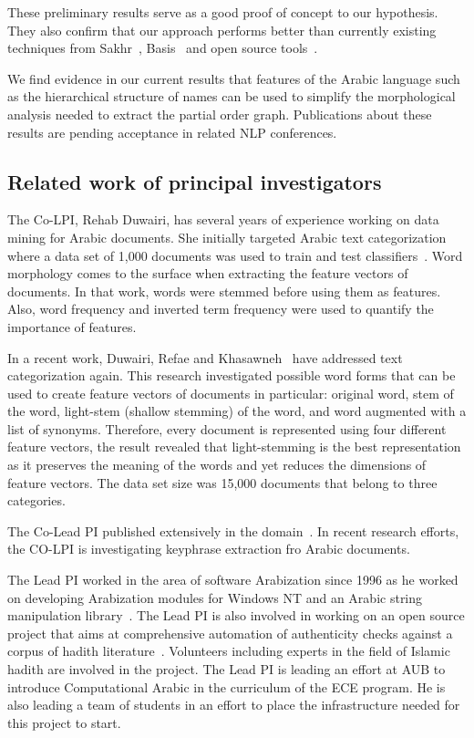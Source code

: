 \documentclass[12pt]{article}
\begin{document}
These preliminary results serve as a good proof of concept to our 
hypothesis. They also confirm that our approach performs better than 
currently existing techniques from Sakhr~\cite{Sak09},
Basis~\cite{Bas09} and open source 
tools~\cite{Col09,Otakar:07,Tim04}.

We find evidence in our current results that features 
of the Arabic language such as the hierarchical structure of
names can be used to simplify the morphological analysis
needed to extract the partial order graph. 
Publications about these results are pending acceptance in 
related NLP conferences. 

\subsection{Related work of principal investigators}

The Co-LPI, Rehab Duwairi, has several years of experience 
working on data mining for Arabic documents. 
She initially targeted Arabic text categorization where a 
data set of 1,000 documents was used to train and test 
classifiers~\cite{Duw06,Duw07}.
Word morphology comes to the surface when extracting the 
feature vectors of documents. 
In that work, words were stemmed before using them as features. 
Also, word frequency and inverted term frequency were used to 
quantify the importance of features. 

In a recent work, Duwairi, Refae and Khasawneh~\cite{Duw09}
have addressed text categorization again. 
This research investigated possible word forms that can be 
used to create feature vectors of documents in particular: 
original word, stem of the word, light-stem (shallow stemming) 
of the word, and word augmented with a list of synonyms. 
Therefore, every document is represented using four different 
feature vectors, the result revealed that light-stemming is the 
best representation as it preserves the meaning of the words 
and yet reduces the dimensions of feature vectors. 
The data set size was 15,000 documents that belong to three 
categories. 

The Co-Lead PI published extensively in the 
domain~\cite{Duw06, Duw07, Duw09}.
In recent research efforts, the CO-LPI is investigating 
keyphrase extraction fro Arabic documents.

The Lead PI worked in the area of software Arabization since 1996 
as he worked on developing Arabization modules for Windows NT 
and an Arabic string manipulation library~\cite{Zar96}. 
The Lead PI is also involved in working on an open source 
project that aims at comprehensive automation of authenticity 
checks against a corpus of hadith literature~\cite{Zar06}.
Volunteers including experts in the field of Islamic hadith
are involved in the project.
The Lead PI is leading an effort at AUB to introduce 
Computational Arabic in the curriculum of the ECE program. 
He is also leading a team of students in an effort to place 
the infrastructure needed for this project to start. 
\end{document}
